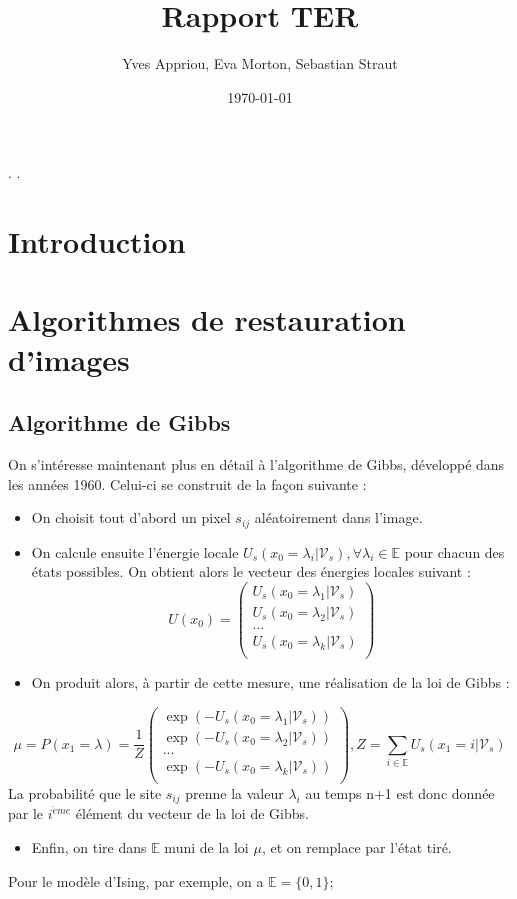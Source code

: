 \documentclass[a4paper, 12pt]{article}
\title{Rapport TER}
\author{Yves Appriou, Eva Morton, Sebastian Straut}
\date{\today}
\begin{document}
\maketitle

\tableofcontents.
\newpage.
\section{Introduction}
\section{Algorithmes de restauration d'images}
\subsection[Algorithme de Gibbs]{Algorithme de Gibbs}
On s'intéresse maintenant plus en détail à l'algorithme de Gibbs, développé dans les années 1960. Celui-ci se construit de la façon suivante : 
\begin{itemize}
\item On choisit tout d'abord un pixel $s_{ij} $ aléatoirement dans l'image.
\item On calcule ensuite l'énergie locale $U_s(x_0=\lambda_i| \mathcal{V}_s), \forall \lambda_i \in \mathbb{E}$ pour chacun des états possibles. On obtient alors le vecteur des énergies locales suivant : 
\[
  U(x_0) = \left(
          \begin{array}{ll}
            U_s(x_0=\lambda_1| \mathcal{V}_s) \\
            U_s(x_0=\lambda_2| \mathcal{V}_s) \\
            ...\\
            U_s(x_0=\lambda_k| \mathcal{V}_s) \\
          \end{array}
        \right)
\]
\item On produit alors, à partir de cette mesure, une réalisation de la loi de Gibbs : 
\end{itemize}
\[
  \mu = P(x_1 = \lambda) = \frac{1}{Z} \left(
          \begin{array}{ll}
            \exp(-U_s(x_0=\lambda_1| \mathcal{V}_s)) \\
            \exp(-U_s(x_0=\lambda_2| \mathcal{V}_s)) \\
            ...\\
            \exp(-U_s(x_0=\lambda_k| \mathcal{V}_s)) \\
          \end{array}
        \right)
        , Z= \sum_{i\in \mathbb{E}} {U_s(x_1=i | \mathcal{V}_s)}
\]
La probabilité que le site $s_{ij}$ prenne la valeur $\lambda_i$ au temps n+1 est donc donnée par le $i^{\grave{e}me}$ élément du vecteur de la loi de Gibbs.
\begin{itemize}
\item Enfin, on tire dans $\mathbb{E}$ muni de la loi $\mu$, et on remplace par l'état tiré.
\end{itemize}
Pour le modèle d'Ising, par exemple, on a $\mathbb{E} =\{0,1\}$;
\end{document}
